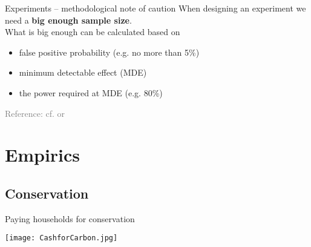 \documentclass[aspectratio=169]{beamer}
\begin{document}
	\begin{frame}{Experiments -- methodological note of caution}
		When designing an experiment we need a \textbf{big enough sample size}. \\ \vspace*{.25cm}
		What is big enough can be calculated based on \\ \vspace*{.25cm}
		\begin{itemize}
			\item false positive probability (e.g. no more than 5\%)
			\item minimum detectable effect (MDE)
			\item the power required at MDE (e.g. 80\%)
		\end{itemize}
		\vspace*{.5cm}
		\scriptsize{\textcolor{gray}{Reference: cf. \cite{Coleman2018} or \underline{} \underline{}}}
	\end{frame}

\section{Empirics}
	\subsection{Conservation}
		\begin{frame}{Paying households for conservation}
			\begin{center}
				\texttt{[image: CashforCarbon.jpg]}
			\end{center}
		\end{frame}
\end{document}
